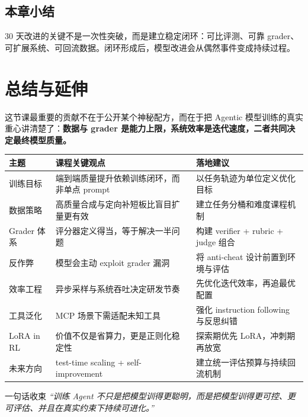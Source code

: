 \documentclass[a4paper]{article}
\begin{document}
\subsection{本章小结}
30 天改进的关键不是一次性突破，而是建立稳定闭环：可比评测、可靠 grader、可扩展系统、可回流数据。闭环形成后，模型改进会从偶然事件变成持续过程。

\section{总结与延伸}

这节课最重要的贡献不在于公开某个神秘配方，而在于把 Agentic 模型训练的真实重心讲清楚了：\textbf{数据与 grader 是能力上限，系统效率是迭代速度，二者共同决定最终模型质量。}

\begin{longtable}{p{2.1cm}p{3.6cm}p{5.2cm}}
\toprule
\textbf{主题} & \textbf{课程关键观点} & \textbf{落地建议} \\
\midrule
训练目标 & 端到端质量提升依赖训练闭环，而非单点 prompt & 以任务轨迹为单位定义优化目标 \\
数据策略 & 高质量合成与定向补短板比盲目扩量更有效 & 建立任务分桶和难度课程机制 \\
Grader 体系 & 评分器定义得当，等于解决一半问题 & 构建 verifier + rubric + judge 组合 \\
反作弊 & 模型会主动 exploit grader 漏洞 & 将 anti-cheat 设计前置到环境与评估 \\
效率工程 & 异步采样与系统吞吐决定研发节奏 & 先优化迭代效率，再追最优配置 \\
工具泛化 & MCP 场景下需适配未知工具 & 强化 instruction following 与反思纠错 \\
LoRA in RL & 价值不仅是省算力，更是正则化稳定性 & 探索期优先 LoRA，冲刺期再放宽 \\
未来方向 & test-time scaling + self-improvement & 建立统一评估预算与持续回流机制 \\
\bottomrule
\end{longtable}

\begin{importantbox}{一句话收束}
\textit{``训练 Agent 不只是把模型训得更聪明，而是把模型训得更可控、更可评估、并且在真实约束下持续可进化。''}
\end{importantbox}
\end{document}
